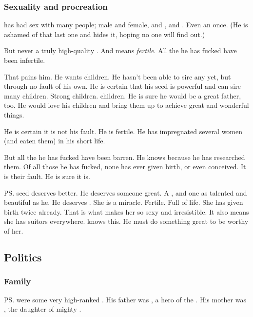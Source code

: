 \subsubsection{Sexuality and procreation}
\Teshrial{} has had sex with many people; male and female, \ketherain and \thelyadeth{}, \humans{} and \nephilim. 
Even an \ashenblood{} \resvil{} once. 
(He is ashamed of that last one and hides it, hoping no one will find out.)

But never a truly high-quality \ketheran{} \resvil. 
And  means \emph{fertile}. 
All the \resviel{} he has fucked have been infertile. 

That pains him. 
He wants children. 
He hasn't been able to sire any yet, but through no fault of his own. 
He is certain that his seed is powerful and can sire many \resphan{} children. 
Strong children. 
\Ketheran{} children. 
He is sure he would be a great father, too. 
He would love his children and bring them up to achieve great and wonderful things. 

He is certain it is not his fault. 
He is fertile. 
He has impregnated several \human{} women (and eaten them) in his short life. 

But all the \resviel{} he has fucked have been barren. 
He knows because he has researched them. 
Of all those he has fucked, none has ever given birth, or even conceived. 
It is their fault. 
He is sure it is. 
\begin{prose}
\end{prose}

\ps{\Teshrial} seed deserves better. 
He deserves someone great. 
A \ketheran, and one as talented and beautiful as he. 
He deserves . 
She is a miracle. 
Fertile. 
Full of life. 
She has given birth twice already. 
That is what makes her so sexy and irresistible. 
It also means she has suitors everywhere. 
\Teshrial{} knows this. 
He must do something great to be worthy of her. 







\subsection{Politics}
\subsubsection{Family}
\ps{\Teshrial} were some very high-ranked \resphain. 
His father was , a hero of the . 
His mother was \Zereth, the daughter of mighty . 





